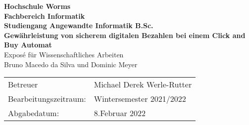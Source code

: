 \begin{titlepage}
    \vspace*{2mm}
    \begin{center}
        \Large
        \textbf{Hochschule Worms}\\
        \textbf{Fachbereich Informatik}\\
        \textbf{Studiengang Angewandte Informatik B.Sc.}\\
        \vspace{1cm}
        \textbf{Gewährleistung von sicherem digitalen Bezahlen bei einem Click and Buy Automat}\\
        \vspace{1cm}
        \large
        Exposé für Wissenschaftliches Arbeiten\\
        \vspace{1cm}
        Bruno Macedo da Silva und Dominic Meyer
        \vspace{3cm}
        \large
        \vspace{4cm}
         \begin {table}[ht]
             \centering
             \begin{tabular}{l l}
                Betreuer                & Michael Derek Werle-Rutter \\
                Bearbeitungszeitraum:   & Wintersemester 2021/2022 \\
                Abgabedatum:            & 8.Februar 2022 \\
             \end{tabular}
         \end {table}
    \end{center}
    \normalsize
    \vfill
 


\end{titlepage}